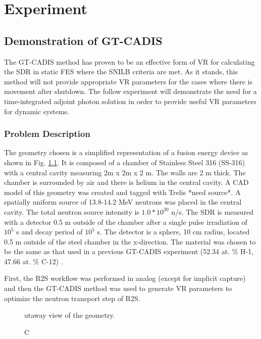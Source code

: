 \chapter{Experiment} \label{ch:exp}

\section{Demonstration of GT-CADIS} \label{sec:gtcadis}
The GT-CADIS method has proven to be an effective form of VR for calculating the
SDR in static FES where the SNILB criteria are met.  As it stands, this method
will not provide appropriate VR parameters for the cases where there is movement
after shutdown.  The follow experiment will demonstrate the need for a
time-integrated adjoint photon solution in order to provide useful VR parameters for
dynamic systems.

\subsection{Problem Description} \label{sec:description}
The geometry chosen is a simplified representation of a fusion energy device as
shown in Fig. \ref{fig:geom}.
It is composed of a chamber of Stainless Steel 316 (SS-316) with a central cavity measuring
2m x 2m x 2 m.  The walls are 2 m thick.  The chamber is surrounded by air and
there is helium in the central cavity.  A CAD model of this geometry was created and tagged
with Trelis *need source*.  A spatially uniform source of
13.8-14.2 MeV neutrons was placed in the central cavity. The total neutron
source intensity is $1.0*10^{20}$ n/s.
The SDR is measured with a detector
0.5 m outside of the chamber after a single pulse irradiation of $10^5$ s and
decay period of $10^5$ s.  The detector is a sphere, 10 cm radius, located 0.5
m outside of the steel chamber in the x-direction. The material was chosen to
be the same as that used in a previous GT-CADIS experiment (52.34 at. \% H-1,
47.66 at. \% C-12) \cite{gtcadis}.  

First, the R2S workflow was performed in analog (except for implicit capture) 
and then the GT-CADIS method was used to generate VR parameters
to optimize the neutron transport step of R2S.

\begin{figure}\label{fig:geom}
  \caption Cutaway view of the geometry.  
\end{figure}

